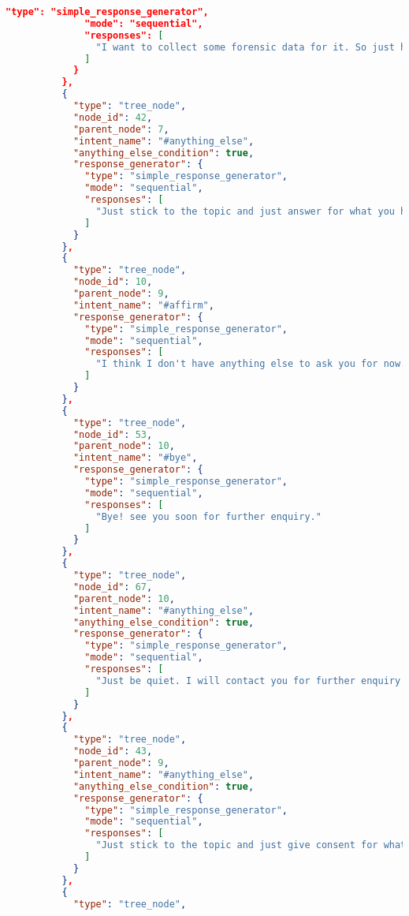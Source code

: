 \begin{appendix}
\begin{lstlisting}[language=json, firstnumber=1]
              "type": "simple_response_generator",
              "mode": "sequential",
              "responses": [
                "I want to collect some forensic data for it. So just hand it over to me. My owner will collect it from you soon."
              ]
            }
          },
          {
            "type": "tree_node",
            "node_id": 42,
            "parent_node": 7,
            "intent_name": "#anything_else",
            "anything_else_condition": true,
            "response_generator": {
              "type": "simple_response_generator",
              "mode": "sequential",
              "responses": [
                "Just stick to the topic and just answer for what you have been asked."
              ]
            }
          },
          {
            "type": "tree_node",
            "node_id": 10,
            "parent_node": 9,
            "intent_name": "#affirm",
            "response_generator": {
              "type": "simple_response_generator",
              "mode": "sequential",
              "responses": [
                "I think I don't have anything else to ask you for now. Once I will have the report, I will enquire you again. Bye!"
              ]
            }
          },
          {
            "type": "tree_node",
            "node_id": 53,
            "parent_node": 10,
            "intent_name": "#bye",
            "response_generator": {
              "type": "simple_response_generator",
              "mode": "sequential",
              "responses": [
                "Bye! see you soon for further enquiry."
              ]
            }
          },
          {
            "type": "tree_node",
            "node_id": 67,
            "parent_node": 10,
            "intent_name": "#anything_else",
            "anything_else_condition": true,
            "response_generator": {
              "type": "simple_response_generator",
              "mode": "sequential",
              "responses": [
                "Just be quiet. I will contact you for further enquiry later."
              ]
            }
          },
          {
            "type": "tree_node",
            "node_id": 43,
            "parent_node": 9,
            "intent_name": "#anything_else",
            "anything_else_condition": true,
            "response_generator": {
              "type": "simple_response_generator",
              "mode": "sequential",
              "responses": [
                "Just stick to the topic and just give consent for what you have been asked."
              ]
            }
          },
          {
            "type": "tree_node",

\end{lstlisting}
\end{appendix}
